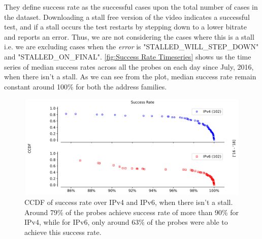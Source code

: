They define success rate as the successful cases upon the total number of cases in the dataset. Downloading a stall free version of the video indicates a successful test, and if a stall occurs
the test restarts by stepping down to a lower bitrate and reports an error. Thus, we are not considering the cases where this is a stall i.e. we are excluding cases when the \textit{error} is "STALLED\_WILL\_STEP\_DOWN" and "STALLED\_ON\_FINAL". 
\cref{fig:Success Rate Timeseries} shows us the time series of median success rates across all the probes on each day since July, 2016, when there isn't a stall. As we can see from the plot, 
median success rate remain constant around 100\% for both the address families.

\begin{figure}[!ht]
	\centering
	\includegraphics[keepaspectratio, height=5cm, width=15cm]{figures/success/netflix-success-rate-ccdf.pdf}
	\caption[Success Rate CCDF]{CCDF of success rate over IPv4 and IPv6, when there isn't a stall. Around 79\% of the probes achieve success rate of more than 90\% for IPv4, while for IPv6, only around 63\% of the probes were able to achieve this success rate.}
	\label{fig:Success Rate CCDF}
\end{figure}


